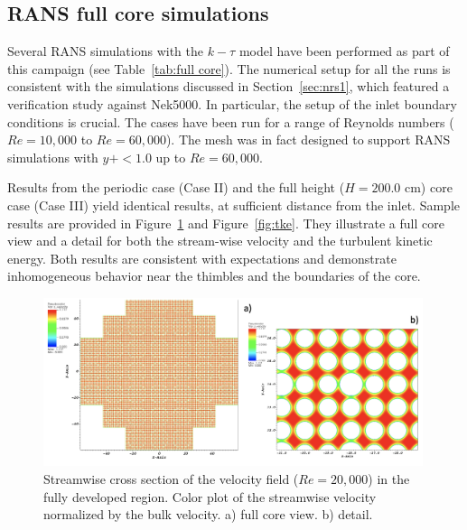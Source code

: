 \subsection{RANS full core simulations}
\label{sec:results2}

Several RANS simulations with the $k-\tau$ model have been performed as part of this campaign (see Table~\ref{tab:full core}). The numerical setup for all the runs is consistent with the simulations discussed in Section~\ref{sec:nrs1}, which featured a verification study against Nek5000. In particular, the setup of the inlet boundary conditions is crucial. The cases have been run for a range of Reynolds numbers ($Re=10,000$ to $Re=60,000$). The mesh was in fact  designed to support RANS simulations with $y+<1.0$ up to $Re=60,000$.

Results from the periodic case (Case II) and the full height ($H=200.0$ cm) core case (Case III) yield identical results, at sufficient distance from the inlet. Sample results are provided in Figure~\ref{fig:vz} and Figure~\ref{fig:tke}. They illustrate a full core view and a detail for both the stream-wise velocity and the turbulent kinetic energy.  Both results are consistent with expectations and demonstrate inhomogeneous behavior near the thimbles and the boundaries of the core.

\begin{figure}[!ht]
\centering
\includegraphics[width=0.99\textwidth]{./figures/periodic_vz.png}
\caption{Streamwise cross section of the velocity field ($Re=20,000$) in the fully developed region. Color plot of the streamwise velocity normalized by the bulk velocity. a) full core view. b) detail.}
\label{fig:vz}
\end{figure}

